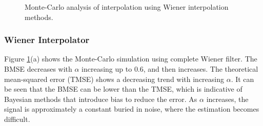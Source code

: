\documentclass[11pt]{article}
\begin{document}
\begin{figure}[t]
\centering
{}
\caption{Monte-Carlo analysis of interpolation using Wiener interpolation methods.}
\label{fig:wiener}
\end{figure}


\subsubsection*{Wiener Interpolator}
\label{subsubsec:wienerimplementation}

Figure \ref{fig:wiener}(a) shows the Monte-Carlo simulation using complete Wiener filter. The BMSE decreases with $\alpha$ increasing up to $0.6$, and then increases. The theoretical mean-squared error (TMSE) shows a decreasing trend with increasing $\alpha$. It can be seen that the BMSE can be lower than the TMSE, which is indicative of Bayesian methods that introduce bias to reduce the error. As $\alpha$ increases, the signal is approximately a constant buried in noise, where the estimation becomes difficult.
\end{document}
